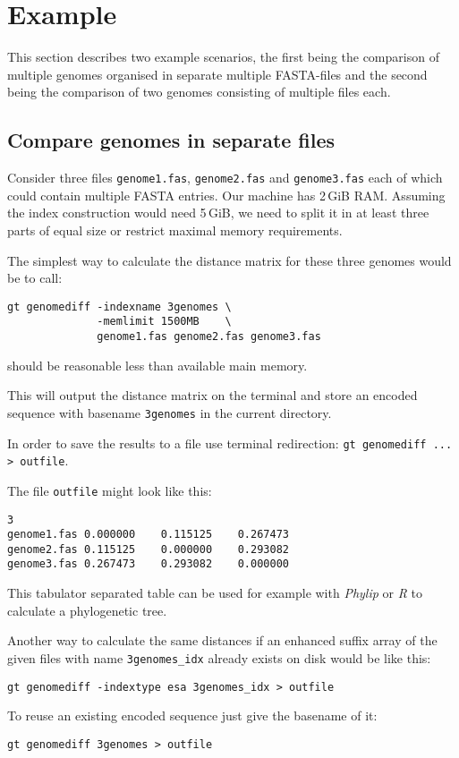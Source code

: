 \documentclass[12pt,titlepage]{article}
\newcommand{\FastA}{FASTA\xspace}
\newcommand{\File}[1]{\texttt{\small #1}}
\begin{document}
\section{Example}
This section describes two example scenarios, the first being the comparison of
multiple genomes organised in separate multiple \FastA-files and the second
being the comparison of two genomes consisting of multiple files each.

\subsection{Compare genomes in separate files}
Consider three files \File{genome1.fas}, \File{genome2.fas} and
\File{genome3.fas} each of which could contain multiple \FastA entries. Our
machine has 2\,GiB RAM. Assuming the index construction would need 5\,GiB, we
need to split it in at least three parts of equal size or restrict maximal
memory requirements.

The simplest way to calculate the distance matrix for these three genomes
would be to call:

\begin{lstlisting}
gt genomediff -indexname 3genomes \
              -memlimit 1500MB    \
              genome1.fas genome2.fas genome3.fas
\end{lstlisting}

 should be reasonable less than available main memory.

This will output the distance matrix on the terminal and store an encoded
sequence with basename \File{3genomes} in the current directory.

In order to save the results to a file use terminal redirection:
\lstinline!gt genomediff ... > outfile!.

The file \File{outfile} might look like this:
\begin{verbatim}
3
genome1.fas	0.000000	0.115125	0.267473
genome2.fas	0.115125	0.000000	0.293082
genome3.fas	0.267473	0.293082	0.000000
\end{verbatim}

This tabulator separated table can be used for example with \textit{Phylip} or
\textit{R} to calculate a phylogenetic tree.

Another way to calculate the same distances if an enhanced suffix array of the
given files with name \File{3genomes\_idx} already exists on disk would be like
this:

\begin{lstlisting}
gt genomediff -indextype esa 3genomes_idx > outfile
\end{lstlisting}
To reuse an existing encoded sequence just give the basename of it:
\begin{lstlisting}
gt genomediff 3genomes > outfile
\end{lstlisting}
\end{document}
